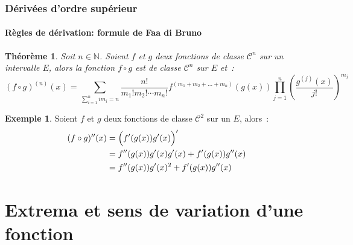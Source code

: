 \documentclass[10pt,notheorems]{beamer}
\theoremstyle{plain}
\newtheorem{theorem}{Théorème}
\theoremstyle{definition} %
\newtheorem{example}{Exemple}
\begin{document}
\begin{frame}
  \frametitle{Dérivées d'ordre supérieur}
  \framesubtitle{Règles de dérivation: formule de Faa di Bruno}
  \hypertarget{slide_derivees_ordre_n_5}{}

  \begin{theorem}\label{thm:faa-di-bruno}
    Soit $n\in\mathbb N$. Soient $f$ et $g$ deux fonctions de classe
    $\mathcal C^n$ sur un intervalle $E$, alors la fonction $f\circ g$
    est de classe $\mathcal C^n$ sur $E$ et~:
    {\small\[
        (f\circ g)^{(n)}(x) = \sum_{\sum_{i=1}^n im_i=n} \frac{n!}{m_1!m_2!\cdots m_n!} f^{(m_1+m_2+\dots+m_n)}(g(x)) \prod_{j=1}^n \left(\frac{g^{(j)}(x)}{j!}\right)^{m_j}
      \]}
  \end{theorem}

  \begin{example}
    Soient $f$ et $g$ deux fonctions de classe $\mathcal C^2$ sur un $E$, alors~:
    \[
      \begin{split}
        (f\circ g)''(x) &= \Bigl(f'(g(x))g'(x)\Bigr)'\\
        &= f''(g(x))g'(x)g'(x)+f'(g(x))g''(x)\\
        &= f''(g(x))g'(x)^2+f'(g(x))g''(x)\\
      \end{split}
    \]
  \end{example}
\end{frame}


\section{Extrema et sens de variation d'une fonction}
\end{document}

